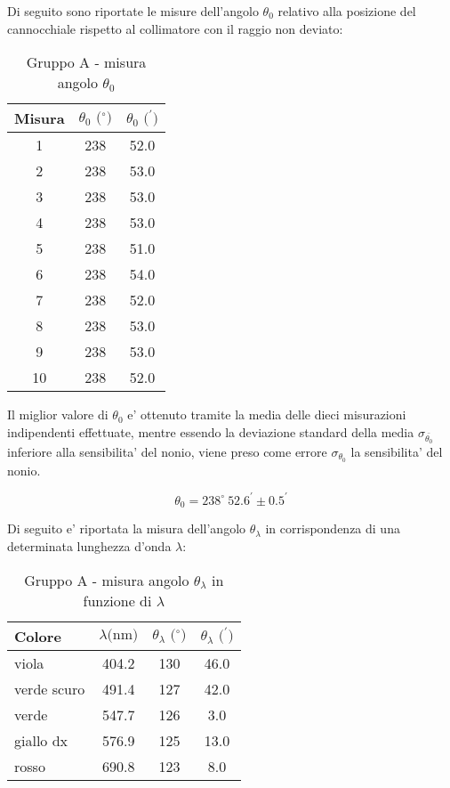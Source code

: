 Di seguito sono riportate le misure dell'angolo $\theta_0$ relativo alla posizione del cannocchiale rispetto al collimatore con il raggio non deviato:
\begin{table}[!htbp]
    {\par\centering
    \begin{tabular}{ccc}
        \hline
        Misura & $\theta_0 \text{ ($^{\circ}$)}$ & $\theta_0 \text{ ($^{\prime}$)}$ \\
        \hline
        1   &   238 &   52.0\\
        2   &   238 &   53.0\\
        3   &   238 &   53.0\\
        4   &   238 &   53.0\\
        5   &   238 &   51.0\\
        6   &   238 &   54.0\\
        7   &   238 &   52.0\\
        8   &   238 &   53.0\\
        9   &   238 &   53.0\\
        10  &   238 &   52.0\\
        \hline
    \end{tabular}
    \par}
    \caption{Gruppo A - misura angolo $\theta_0$}
\end{table}

Il miglior valore di $\theta_0$ e' ottenuto tramite la media delle dieci misurazioni indipendenti effettuate, mentre essendo la deviazione standard della media $\sigma_{\bar{\theta_0}}$ inferiore alla sensibilita' del nonio, viene preso come errore $\sigma_{\theta_0}$ la sensibilita' del nonio.

\[
    \theta_0 = 238^{\circ} \ 52.6^{\prime} \pm 0.5^{\prime}
\]

Di seguito e' riportata la misura dell'angolo $\theta_{\lambda}$ in corrispondenza di una determinata lunghezza d'onda $\lambda$:
\begin{table}[!htbp]
    {\par\centering
    \begin{tabular}{lccc}
        \hline
            Colore &
            $\lambda \text{(nm)}$ &
            $\theta_{\lambda} \text{ ($^{\circ}$)}$ & 
            $\theta_{\lambda} \text{ ($^{\prime}$)}$ \\
        \hline
        viola       &   404.2   &   130 &   46.0\\
        verde scuro &   491.4   &   127 &   42.0\\
        verde       &   547.7   &   126 &   3.0\\
        giallo dx   &   576.9   &   125 &   13.0\\
        rosso       &   690.8   &   123 &   8.0\\
        \hline
    \end{tabular}
    \par}
    \caption{Gruppo A - misura angolo $\theta_{\lambda}$ in funzione di $\lambda$}
\end{table}


